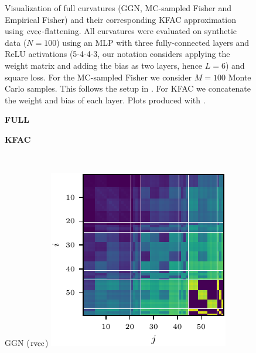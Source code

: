 \begin{figure}[t!]
\begin{minipage}[t]{0.485\linewidth}
  \end{minipage}
  \caption{Visualization of full curvatures (GGN, MC-sampled Fisher and Empirical Fisher) and their corresponding KFAC approximation using $\operatorname{cvec}$-flattening. All curvatures were evaluated on synthetic data ($N = 100$) using an MLP with three fully-connected layers and ReLU activations (5-4-4-3, our notation considers applying the weight matrix and adding the bias as two layers, hence $L=6$) and square loss. For the MC-sampled Fisher we consider $M = 100$ Monte Carlo samples. This follows the setup in . For KFAC we concatenate the weight and bias of each layer.
    Plots produced with .}
  \label{fig:kfac-full-comparison}
\end{figure}

\begin{figure}[t!]
  \centering
  \begin{minipage}[t]{0.485\linewidth}
    \centering
    \textbf{FULL}
  \end{minipage}
  \hfill
  \begin{minipage}[t]{0.485\linewidth}
    \centering
    \textbf{KFAC}
  \end{minipage}
  \\
  \begin{minipage}[t]{0.485\linewidth}
    \centering
    GGN ($\operatorname{rvec}$)\vspace{1ex}
    \includegraphics[width=0.8\linewidth]{../kfs/plots/synthetic_rvec_ggn_full.pdf}
  \end{minipage}
  \hfill
  \begin{minipage}[t]{0.485\linewidth}

\end{minipage}
\end{figure}
